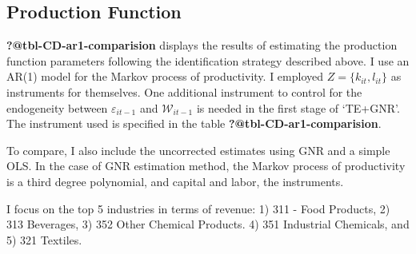 \documentclass[
  12pt]{article}
\theoremstyle{definition}
\theoremstyle{remark}
\begin{document}
\begin{table}

\caption{\label{tbl-np-deconv}Semiparametric Deconvolution of Tax
Evasion using Penalized B-Splines. I used a kernel density estimator to
fit the error density on the residuals of the first stage conditional on
firms being Non-Evaders.}


\end{table}%

\subsection{Production Function}\label{production-function}

\textbf{?@tbl-CD-ar1-comparision} displays the results of estimating the
production function parameters following the identification strategy
described above. I use an AR(1) model for the Markov process of
productivity. I employed \(Z=\{k_{it},l_{it}\}\) as instruments for
themselves. One additional instrument to control for the endogeneity
between \(\varepsilon_{it-1}\) and \(\mathcal{W}_{it-1}\) is needed in
the first stage of `TE+GNR'. The instrument used is specified in the
table \textbf{?@tbl-CD-ar1-comparision}.

To compare, I also include the uncorrected estimates using GNR and a
simple OLS. In the case of GNR estimation method, the Markov process of
productivity is a third degree polynomial, and capital and labor, the
instruments.

I focus on the top 5 industries in terms of revenue: 1) 311 - Food
Products, 2) 313 Beverages, 3) 352 Other Chemical Products. 4) 351
Industrial Chemicals, and 5) 321 Textiles.
\end{document}
